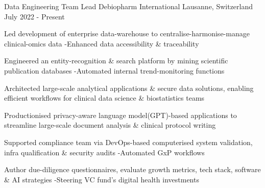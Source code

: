 

\begin{cventries}

\vspace{-0.3cm}
 \cventry
    {Data Engineering Team Lead} %
    {Debiopharm International} %
    {Lausanne, Switzerland} %
    {July 2022 - Present} %
    {
      \begin{cvitems} %
        \item {Led development of enterprise data-warehouse to centralise-harmonise-manage clinical-omics data -Enhanced data accessibility \& traceability}
        \item {Engineered an entity-recognition \& search platform by mining scientific publication databases -Automated internal trend-monitoring functions}
        \item {Architected large-scale analytical applications \& secure data solutions, enabling efficient workflows for clinical data science \& biostatistics teams}
        \item {Productionised privacy-aware language model(GPT)-based applications to streamline large-scale document analysis \& clinical protocol writing}
        \item {Supported compliance team via DevOps-based computerised system validation, infra qualification \& security audits -Automated GxP workflows}
        \item {Author due-diligence questionnaires, evaluate growth metrics, tech stack, software \& AI strategies -Steering VC fund's digital health investments}
      \end{cvitems}
    }
	
	\vspace{-0.1cm}
	

\end{cventries}
